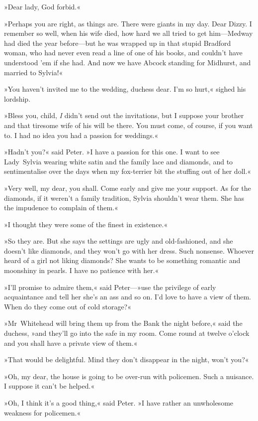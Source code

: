 »Dear lady, God forbid.«

»Perhaps you are right, as things are. There were giants in my day. Dear Dizzy. I remember so well, when his wife died, how hard we all tried to get him—Medway had died the year before—but he was wrapped up in that stupid Bradford woman, who had never even read a line of one of his books, and couldn't have understood 'em if she had. And now we have Abcock standing for Midhurst, and married to Sylvia!«

»You haven't invited me to the wedding, duchess dear. I'm so hurt,« sighed his lordship.

»Bless you, child, \textit{I} didn't send out the invitations, but I suppose your brother and that tiresome wife of his will be there. You must come, of course, if you want to. I had no idea you had a passion for weddings.«

»Hadn't you?« said Peter. »I have a passion for this one. I want to see Lady~Sylvia wearing white satin and the family lace and diamonds, and to sentimentalise over the days when my fox-terrier bit the stuffing out of her doll.«

»Very well, my dear, you shall. Come early and give me your support. As for the diamonds, if it weren't a family tradition, Sylvia shouldn't wear them. She has the impudence to complain of them.«

»I thought they were some of the finest in existence.«

»So they are. But she says the settings are ugly and old-fashioned, and she doesn't like diamonds, and they won't go with her dress. Such nonsense. Whoever heard of a girl not liking diamonds? She wants to be something romantic and moonshiny in pearls. I have no patience with her.«

»I'll promise to admire them,« said Peter—»use the privilege of early acquaintance and tell her she's an ass and so on. I'd love to have a view of them. When do they come out of cold storage?«

»Mr~Whitehead will bring them up from the Bank the night before,« said the duchess, »and they'll go into the safe in my room. Come round at twelve o'clock and you shall have a private view of them.«

»That would be delightful. Mind they don't disappear in the night, won't you?«

»Oh, my dear, the house is going to be over-run with policemen. Such a nuisance. I suppose it can't be helped.«

»Oh, I think it's a good thing,« said Peter. »I have rather an unwholesome weakness for policemen.«

